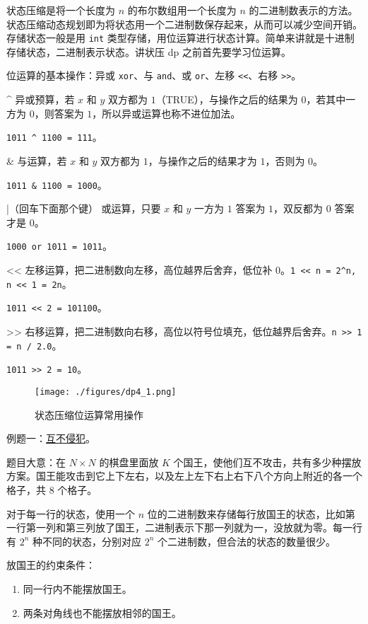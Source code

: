 
状态压缩是将一个长度为 $n$ 的布尔数组用一个长度为 $n$ 的二进制数表示的方法。状态压缩动态规划即为将状态用一个二进制数保存起来，从而可以减少空间开销。存储状态一般是用 \verb|int| 类型存储，用位运算进行状态计算。简单来讲就是十进制存储状态，二进制表示状态。讲状压 dp 之前首先要学习位运算。

位运算的基本操作：异或 \verb|xor|、与 \verb|and|、或 \verb|or|、左移 \verb|<<|、右移 \verb|>>|。

^ 异或预算，若 $x$ 和 $y$ 双方都为 $1$（TRUE），与操作之后的结果为 $0$，若其中一方为 $0$，则答案为 $1$，所以异或运算也称不进位加法。

\verb|1011 ^ 1100 = 111|。

& 与运算，若 $x$ 和 $y$ 双方都为 $1$，与操作之后的结果才为 $1$，否则为 $0$。

\verb|1011 & 1100 = 1000|。

|（回车下面那个键） 或运算，只要 $x$ 和 $y$ 一方为 $1$ 答案为 $1$，双反都为 $0$ 答案才是 $0$。

\verb|1000 or 1011 = 1011|。

<< 左移运算，把二进制数向左移，高位越界后舍弃，低位补 $0$。\verb|1 << n = 2^n, n << 1 = 2n|。

\verb|1011 << 2 = 101100|。

>> 右移运算，把二进制数向右移，高位以符号位填充，低位越界后舍弃。\verb|n >> 1 = n / 2.0|。

\verb|1011 >> 2 = 10|。

\begin{figure}[ht]
\centering
\texttt{[image: ./figures/dp4\_1.png]}
\caption{状态压缩位运算常用操作} \label{dp4_fig1}
\end{figure}

例题一：\href{https://loj.ac/p/2153}{互不侵犯}。

题目大意：在 $N \times N$ 的棋盘里面放 $K$ 个国王，使他们互不攻击，共有多少种摆放方案。国王能攻击到它上下左右，以及左上左下右上右下八个方向上附近的各一个格子，共 $8$ 个格子。

对于每一行的状态，使用一个 $n$ 位的二进制数来存储每行放国王的状态，比如第一行第一列和第三列放了国王，二进制表示下那一列就为一，没放就为零。每一行有 $2^n$ 种不同的状态，分别对应 $2^n$ 个二进制数，但合法的状态的数量很少。

放国王的约束条件：
\begin{enumerate}
\item 同一行内不能摆放国王。
\item 两条对角线也不能摆放相邻的国王。
\end{enumerate}

